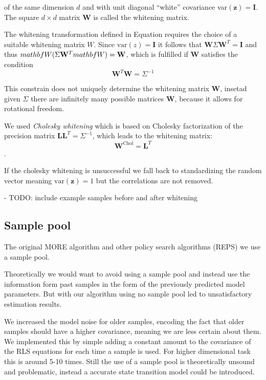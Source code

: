 of the same dimension $d$ and with unit diagonal ``white'' covariance
var$(\mathbf{z}) = \mathbf{I}$. The square $d \times d$
matrix $\mathbf{W}$ is called the whitening matrix.

The whitening transformation defined in Equation  requires
the choice of a suitable whitening matrix $W$.
Since $\text{var}(z) = \mathbf{I}$ it follows that
$\mathbf{W}\Sigma \mathbf{W}^T = \mathbf{I}$ and thus
$\\mathbf{W}(\Sigma \mathbf{W}^T\\mathbf{W}) = \mathbf{W}$, which
is fulfilled if $\mathbf{W}$ satisfies the condition
$$ \mathbf{W}^T \mathbf{W} = \Sigma^{-1} $$

This constrain does not uniquely determine the whitening
matrix $\mathbf{W}$, insetad given $\Sigma$ there are infinitely many
possible matrices $\mathbf{W}$, because it allows for rotational freedom.


We used \textit{Cholesky whitening} which is based on
Cholesky factorization of the precision matrix
$\mathbf{L}\mathbf{L}^T = \Sigma^{-1}$, which leads to the whitening
matrix:
$$ \mathbf{W}^{\text{Chol}} = \mathbf{L}^T $$.

If the cholesky whitening is unsuccessful we fall back to standardizing
the random vector meaning $\text{var}(\mathbf{z}) = 1$ but the correlations
are not removed.

- TODO: include example samples before and after whitening

\subsection{Sample pool}
The original MORE algorithm and other policy search algorithms (REPS) we
use a sample pool.

Theoretically  we would want to avoid using a sample pool and instead use
the information form past samples in the form of the previously predicted
model parameters. But with our algorithm using no sample pool led
to unsatisfactory estimation results.

We increased the model noise for older samples, encoding the fact that
older samples should have a higher covariance, meaning we are less
certain about them. We implemented this by simple adding a constant
amount to the covariance of the RLS equations for each time a sample is
used. For higher dimensional task this is around 5-10 times.
Still the use of a sample pool is theoretically unsound and problematic,
instead a accurate state transition model could be introduced.

